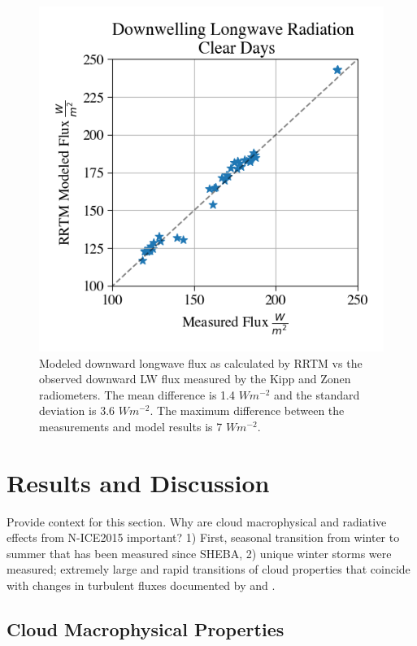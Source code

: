 \begin{figure}[H]
    \centering
    \includegraphics[width=0.65\linewidth]{figures/chapter4/RRTMcorrelation.png}
    \caption[RRTM modeled downward longwave flux vs measured flux.]{Modeled downward longwave flux as calculated by RRTM vs the observed downward LW flux measured by the Kipp and Zonen radiometers. The mean difference is 1.4 $W m^{-2}$ and the standard deviation is 3.6 $Wm^{-2}$. The maximum difference between the measurements and model results is 7 $Wm^{-2}$.}
    \label{fig:rrtm}
\end{figure}

\section{Results and Discussion}

Provide context for this section. Why are cloud macrophysical and radiative effects from N-ICE2015 important? 1) First, seasonal transition from winter to summer that has been measured since SHEBA, 2) unique winter storms were measured; extremely large and rapid transitions of cloud properties that coincide with changes in turbulent fluxes documented by \citet{walden:2017} and \citet{graham:2017}.

\subsection{Cloud Macrophysical Properties}

